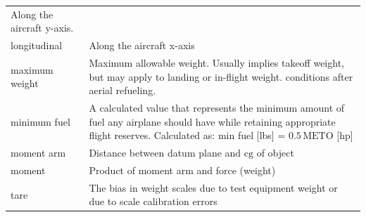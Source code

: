 \documentclass[
]{book}
\begin{document}
\begin{longtable}[]{@{}ll@{}}
\begin{minipage}[t]{0.83\columnwidth}
Along the aircraft y-axis.\strut
\end{minipage}\tabularnewline
\begin{minipage}[t]{0.11\columnwidth}\raggedright
longitudinal\strut
\end{minipage} & \begin{minipage}[t]{0.83\columnwidth}\raggedright
Along the aircraft x-axis\strut
\end{minipage}\tabularnewline
\begin{minipage}[t]{0.11\columnwidth}\raggedright
maximum weight\strut
\end{minipage} & \begin{minipage}[t]{0.83\columnwidth}\raggedright
Maximum allowable weight. Usually implies takeoff weight, but may apply to landing or in-flight weight. conditions after aerial refueling.\strut
\end{minipage}\tabularnewline
\begin{minipage}[t]{0.11\columnwidth}\raggedright
minimum fuel\strut
\end{minipage} & \begin{minipage}[t]{0.83\columnwidth}\raggedright
A calculated value that represents the minimum amount of fuel any airplane should have while retaining appropriate flight reserves. Calculated as: min fuel {[}lbs{]} = \(0.5 \, \mathrm{METO}\) {[}hp{]}\strut
\end{minipage}\tabularnewline
\begin{minipage}[t]{0.11\columnwidth}\raggedright
moment arm\strut
\end{minipage} & \begin{minipage}[t]{0.83\columnwidth}\raggedright
Distance between datum plane and \(\mathrm{cg}\) of object\strut
\end{minipage}\tabularnewline
\begin{minipage}[t]{0.11\columnwidth}\raggedright
moment\strut
\end{minipage} & \begin{minipage}[t]{0.83\columnwidth}\raggedright
Product of moment arm and force (weight)\strut
\end{minipage}\tabularnewline
\begin{minipage}[t]{0.11\columnwidth}\raggedright
tare\strut
\end{minipage} & \begin{minipage}[t]{0.83\columnwidth}\raggedright
The bias in weight scales due to test equipment weight or due to scale calibration errors\strut
\end{minipage}\tabularnewline

\end{longtable}
\end{document}
